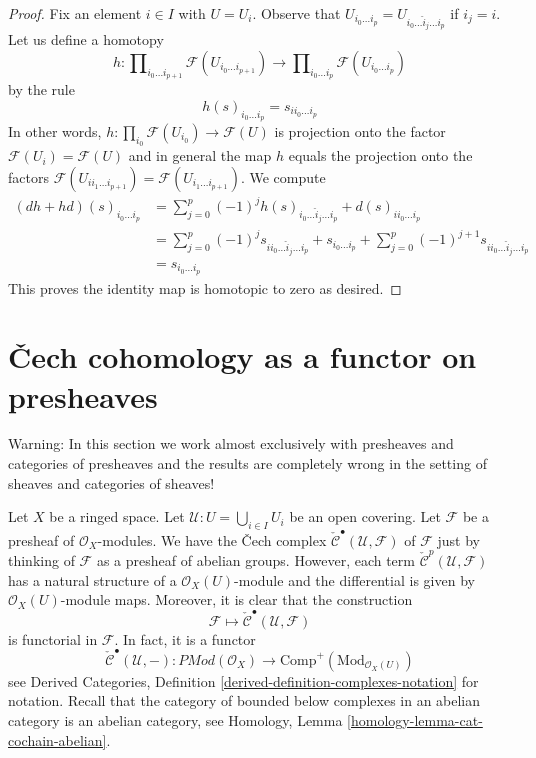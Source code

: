 \begin{proof}
Fix an element $i \in I$ with $U = U_i$. Observe that
$U_{i_0 \ldots i_p} = U_{i_0 \ldots \hat i_j \ldots i_p}$ if $i_j = i$.
Let us define a homotopy
$$
h :
\prod\nolimits_{i_0 \ldots i_{p + 1}} \mathcal{F}(U_{i_0 \ldots i_{p + 1}})
\longrightarrow
\prod\nolimits_{i_0 \ldots i_p} \mathcal{F}(U_{i_0 \ldots i_p})
$$
by the rule
$$
h(s)_{i_0 \ldots i_p} = s_{i i_0 \ldots i_p}
$$
In other words, $h : \prod_{i_0} \mathcal{F}(U_{i_0}) \to \mathcal{F}(U)$
is projection onto the factor $\mathcal{F}(U_i) = \mathcal{F}(U)$
and in general the map $h$ equals the projection onto the factors
$\mathcal{F}(U_{i i_1 \ldots i_{p + 1}}) =
\mathcal{F}(U_{i_1 \ldots i_{p + 1}})$.
We compute
\begin{align*}
(dh + hd)(s)_{i_0 \ldots i_p}
& =
\sum\nolimits_{j = 0}^p
(-1)^j
h(s)_{i_0 \ldots \hat i_j \ldots i_p}
+
d(s)_{i i_0 \ldots i_p}\\
& =
\sum\nolimits_{j = 0}^p
(-1)^j
s_{i i_0 \ldots \hat i_j \ldots i_p}
+
s_{i_0 \ldots i_p}
+
\sum\nolimits_{j = 0}^p
(-1)^{j + 1}
s_{i i_0 \ldots \hat i_j \ldots i_p} \\
& =
s_{i_0 \ldots i_p}
\end{align*}
This proves the identity map is homotopic to zero as desired.
\end{proof}






\section{{\v C}ech cohomology as a functor on presheaves}
\label{section-cech-functor}

\noindent
Warning: In this section we work almost exclusively with presheaves and
categories of presheaves and the results are completely wrong in the
setting of sheaves and categories of sheaves!

\medskip\noindent
Let $X$ be a ringed space.
Let $\mathcal{U} : U = \bigcup_{i \in I} U_i$ be an open covering.
Let $\mathcal{F}$ be a presheaf of $\mathcal{O}_X$-modules.
We have the {\v C}ech complex
$\check{\mathcal{C}}^\bullet(\mathcal{U}, \mathcal{F})$
of $\mathcal{F}$ just by thinking of $\mathcal{F}$
as a presheaf of abelian groups. However, each term
$\check{\mathcal{C}}^p(\mathcal{U}, \mathcal{F})$ has a natural
structure of a $\mathcal{O}_X(U)$-module and the differential is given by
$\mathcal{O}_X(U)$-module maps. Moreover, it is clear that the
construction
$$
\mathcal{F} \longmapsto \check{\mathcal{C}}^\bullet(\mathcal{U}, \mathcal{F})
$$
is functorial in $\mathcal{F}$. In fact, it is a functor
\begin{equation}
\label{equation-cech-functor}
\check{\mathcal{C}}^\bullet(\mathcal{U}, -) :
\textit{PMod}(\mathcal{O}_X)
\longrightarrow
\text{Comp}^{+}(\text{Mod}_{\mathcal{O}_X(U)})
\end{equation}
see
Derived Categories, Definition \ref{derived-definition-complexes-notation}
for notation. Recall that the category of bounded below complexes
in an abelian category is an abelian category, see
Homology, Lemma \ref{homology-lemma-cat-cochain-abelian}.

